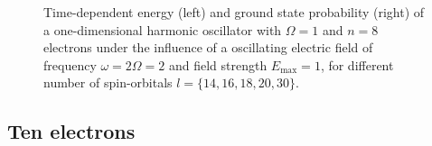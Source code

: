\begin{figure}[!h]
{\begin{minipage}{0.6\textwidth}
    \end{minipage}
    }
    \caption{Time-dependent energy (left) and ground state probability (right)
        of a one-dimensional harmonic oscillator with $\Omega=1$
        and $n=8$ electrons under the influence of a oscillating electric field 
        of frequency $\omega = 2 \Omega = 2$ and field strength $E_\text{max}=1$,
        for different number of spin-orbitals $l=\{14,16,18,20,30\}$.
    }
    \label{fig:1d_n8_qd}
\end{figure}

\pagebreak

\subsection*{Ten electrons}

\begin{figure}[!h]
    \centering
\end{figure}
